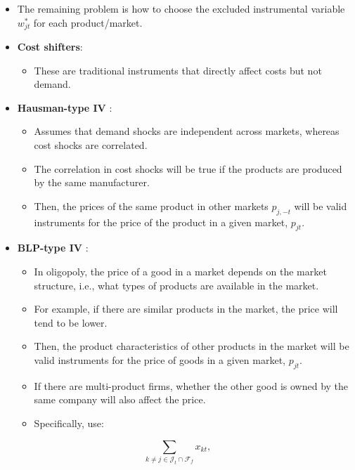 \documentclass[
]{book}
\providecommand{\tightlist}{%
  \setlength{\itemsep}{0pt}\setlength{\parskip}{0pt}}
\begin{document}
\begin{itemize}
\tightlist
\item
  The remaining problem is how to choose the excluded instrumental variable \(w_{jt}^*\) for each product/market.
\item
  \textbf{Cost shifters}:

  \begin{itemize}
  \tightlist
  \item
    These are traditional instruments that directly affect costs but not demand.
  \end{itemize}
\item
  \textbf{Hausman-type IV} \citep{Hausman1994}:

  \begin{itemize}
  \tightlist
  \item
    Assumes that demand shocks are independent across markets, whereas cost shocks are correlated.
  \item
    The correlation in cost shocks will be true if the products are produced by the same manufacturer.
  \item
    Then, the prices of the same product in other markets \(p_{j, -t}\) will be valid instruments for the price of the product in a given market, \(p_{jt}\).
  \end{itemize}
\item
  \textbf{BLP-type IV} \citep{berryAutomobilePricesMarket1995}:

  \begin{itemize}
  \tightlist
  \item
    In oligopoly, the price of a good in a market depends on the market structure, i.e., what types of products are available in the market.
  \item
    For example, if there are similar products in the market, the price will tend to be lower.
  \item
    Then, the product characteristics of other products in the market will be valid instruments for the price of goods in a given market, \(p_{jt}\).
  \item
    If there are multi-product firms, whether the other good is owned by the same company will also affect the price.
  \item
    Specifically, \citet{berryAutomobilePricesMarket1995} use:
  \end{itemize}
\end{itemize}

\begin{equation}
\sum_{k \neq j \in \mathcal{J}_t \cap \mathcal{F}_{f}} x_{kt},
\end{equation}
\end{document}
